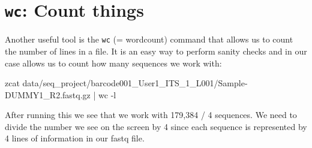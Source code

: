 \documentclass[
  letterpaper,
  DIV=11,
  numbers=noendperiod]{scrreprt}
\newenvironment{Shaded}{}{}
\newcommand{\AttributeTok}[1]{\textcolor[rgb]{0.84,0.23,0.29}{#1}}
\newcommand{\FunctionTok}[1]{\textcolor[rgb]{0.44,0.26,0.76}{#1}}
\newcommand{\KeywordTok}[1]{\textcolor[rgb]{0.84,0.23,0.29}{#1}}
\newcommand{\NormalTok}[1]{\textcolor[rgb]{0.14,0.16,0.18}{#1}}
\begin{document}
\section{\texorpdfstring{\texttt{wc}: Count
things}{wc: Count things}}\label{wc-count-things-1}

Another useful tool is the \texttt{wc} (= wordcount) command that allows
us to count the number of lines in a file. It is an easy way to perform
sanity checks and in our case allows us to count how many sequences we
work with:

\begin{Shaded}
\begin{Highlighting}[]
\FunctionTok{zcat}\NormalTok{ data/seq\_project/barcode001\_User1\_ITS\_1\_L001/Sample{-}DUMMY1\_R2.fastq.gz }\KeywordTok{|} \FunctionTok{wc} \AttributeTok{{-}l}
\end{Highlighting}
\end{Shaded}

After running this we see that we work with 179,384 / 4 sequences. We
need to divide the number we see on the screen by 4 since each sequence
is represented by 4 lines of information in our fastq file.
\end{document}
